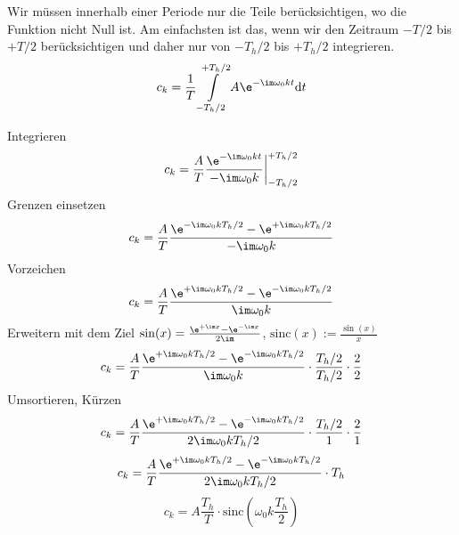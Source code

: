 \begin{Ansatz}
%
Wir müssen innerhalb einer Periode nur die Teile berücksichtigen, wo
die Funktion nicht Null ist. Am einfachsten ist das, wenn wir den
Zeitraum $-T/2$ bis $+T/2$ berücksichtigen und daher nur von $-T_h/2$ bis $+T_h/2$
integrieren.
\begin{equation}
c_k = \frac{1}{T} \int\limits_{-T_h/2}^{+T_h/2} A \e^{-\im \omega_0 k t} \mathrm{d}t
\end{equation}
%
\end{Ansatz}
%
\begin{ExCalc}
Integrieren
\begin{equation}
c_k = \frac{A}{T} \frac{\e^{-\im \omega_0 k t}}{-\im \omega_0 k }\bigg|_{-T_h/2}^{+T_h/2}
\end{equation}
Grenzen einsetzen
\begin{equation}
c_k = \frac{A}{T} \frac{\e^{-\im \omega_0 k T_h/2} - \e^{+\im \omega_0 k T_h/2}}{-\im \omega_0 k }
\end{equation}
Vorzeichen
\begin{equation}
c_k = \frac{A}{T} \frac{\e^{+\im \omega_0 k T_h/2}-\e^{-\im \omega_0 k T_h/2}}{\im \omega_0 k }
\end{equation}
Erweitern mit dem Ziel $\sin(x) = \frac{\e^{+\im x}-\e^{-\im x}}{2\im}$, $\mathrm{sinc}(x):=\frac{\sin(x)}{x}$
\begin{equation}
c_k = \frac{A}{T} \frac{\e^{+\im \omega_0 k T_h/2}-\e^{-\im \omega_0 k T_h/2}}{\im \omega_0 k } \cdot \frac{T_h/2}{T_h/2} \cdot \frac{2}{2}
\end{equation}
Umsortieren, Kürzen
\begin{equation}
c_k = \frac{A}{T} \frac{\e^{+\im \omega_0 k T_h/2}-\e^{-\im \omega_0 k T_h/2}}{2\im \omega_0 k T_h/2} \cdot \frac{T_h/2}{1} \cdot \frac{2}{1}
\end{equation}
%
\begin{equation}
c_k = \frac{A}{T} \frac{\e^{+\im \omega_0 k T_h/2}-\e^{-\im \omega_0 k T_h/2}}{2\im \omega_0 k T_h/2} \cdot T_h
\end{equation}
%
\begin{equation}
c_k = A \frac{T_h}{T} \cdot \mathrm{sinc}(\omega_0 k \frac{T_h}{2})
\end{equation}
\end{ExCalc}

